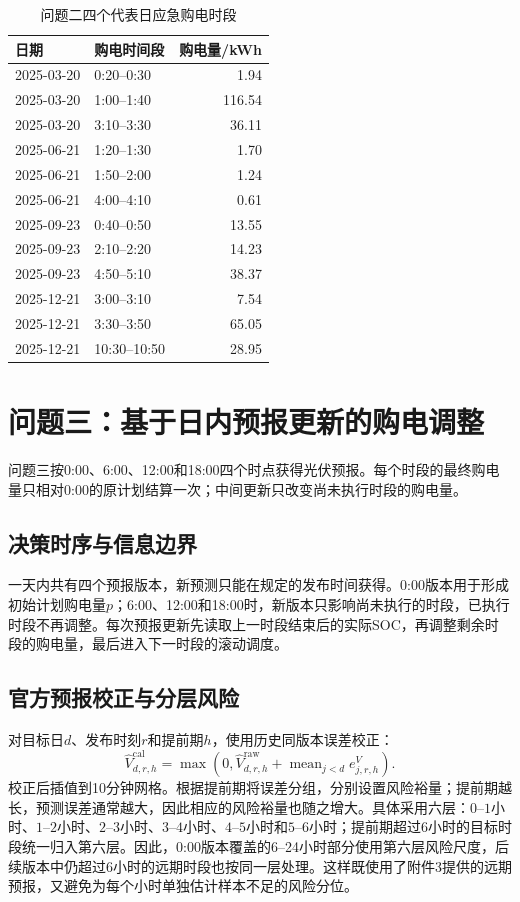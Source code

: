 \documentclass[UTF8,12pt,a4paper]{ctexart}
\theoremstyle{remark}
\begin{document}
\begin{table}[htbp]\centering\scriptsize
\caption{问题二四个代表日应急购电时段}\label{tab:q2-emergency}
\begin{tabular}{llr}\toprule 日期&购电时间段&购电量/kWh\\\midrule
2025-03-20&0:20--0:30&1.94\\
2025-03-20&1:00--1:40&116.54\\
2025-03-20&3:10--3:30&36.11\\
2025-06-21&1:20--1:30&1.70\\
2025-06-21&1:50--2:00&1.24\\
2025-06-21&4:00--4:10&0.61\\
2025-09-23&0:40--0:50&13.55\\
2025-09-23&2:10--2:20&14.23\\
2025-09-23&4:50--5:10&38.37\\
2025-12-21&3:00--3:10&7.54\\
2025-12-21&3:30--3:50&65.05\\
2025-12-21&10:30--10:50&28.95\\\bottomrule\end{tabular}\end{table}

\section{问题三：基于日内预报更新的购电调整}
问题三按0:00、6:00、12:00和18:00四个时点获得光伏预报。每个时段的最终购电量只相对0:00的原计划结算一次；中间更新只改变尚未执行时段的购电量。
\subsection{决策时序与信息边界}
一天内共有四个预报版本，新预测只能在规定的发布时间获得。0:00版本用于形成初始计划购电量$p$；6:00、12:00和18:00时，新版本只影响尚未执行的时段，已执行时段不再调整。每次预报更新先读取上一时段结束后的实际SOC，再调整剩余时段的购电量，最后进入下一时段的滚动调度。
\subsection{官方预报校正与分层风险}
对目标日$d$、发布时刻$r$和提前期$h$，使用历史同版本误差校正：
\begin{equation}\widehat V^{\mathrm{cal}}_{d,r,h}=\max\left(0,\widehat V^{\mathrm{raw}}_{d,r,h}+\operatorname{mean}_{j<d}e^V_{j,r,h}\right).\label{eq:q3-calibrate}\end{equation}
校正后插值到10分钟网格。根据提前期将误差分组，分别设置风险裕量；提前期越长，预测误差通常越大，因此相应的风险裕量也随之增大。具体采用六层：$0$--$1$小时、$1$--$2$小时、$2$--$3$小时、$3$--$4$小时、$4$--$5$小时和$5$--$6$小时；提前期超过$6$小时的目标时段统一归入第六层。因此，0:00版本覆盖的6--24小时部分使用第六层风险尺度，后续版本中仍超过6小时的远期时段也按同一层处理。这样既使用了附件3提供的远期预报，又避免为每个小时单独估计样本不足的风险分位。
\end{document}
